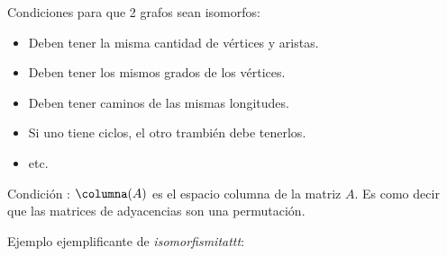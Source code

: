 \begin{enumerate}[label=\tiny\purple{\faIcon{calculator}}]
        Condiciones  para que 2 grafos sean isomorfos:
        \begin{itemize}
          \item Deben tener la misma cantidad de vértices y aristas.
          \item Deben tener los mismos grados de los vértices.
          \item Deben tener caminos de las mismas longitudes.
          \item Si uno tiene ciclos, el otro trambién debe tenerlos.
          \item etc.
        \end{itemize}

        Condición :
        $\columna(A)$ es el espacio columna de la matriz $A$. Es como decir que las matrices de adyacencias son una permutación.

        Ejemplo ejemplificante de \textit{isomorfismitattt}:


\end{enumerate}
